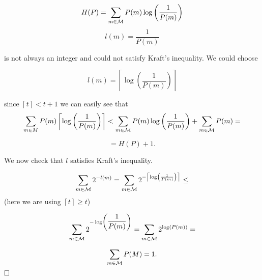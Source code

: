 \[
 H(P) = \sum_{m \in \mathcal{M}} P(m)\log\left(\dfrac{1}{P(m)}\right)
\]
\[
l(m) = \dfrac{1}{P(m)}
\]

is not always an integer and could not satisfy Kraft's inequality. We could choose

\[
l(m) = \left\lceil\log\left(\dfrac{1}{P(m)}\right)\right\rceil
\]

since $\left\lceil t \right\rceil < t + 1$ we can easily see that 
\[
\sum_{m \in M} P(m)\left\lceil\log\left(\dfrac{1}{P(m)}\right)\right\rceil < \sum_{m \in \mathcal{M}} P(m)\log\left(\dfrac{1}{P(m)}\right) + \sum_{m \in \mathcal{M}} P(m) = 
\]

\[
 = H(P) + 1.
\]

We now check that $l$ satisfies Kraft's inequality.

\[
\sum_{m \in \mathcal{M}} 2^{-l(m)} = \sum_{m \in \mathcal{M}} 2^{-\left\lceil\log\left(\frac{1}{P(m)}\right)\right\rceil} \leq
\]
(here we are using $\left\lceil t \right\rceil \geq t$)

\[
 \sum_{m \in \mathcal{M}} 2^{-\log\left(\dfrac{1}{P(m)}\right)} = \sum_{m \in \mathcal{M}} 2^{\log(P(m))} =
\]

\[
 \sum_{m \in \mathcal{M}} P(M) = 1.
\]
$\hfill\Box$